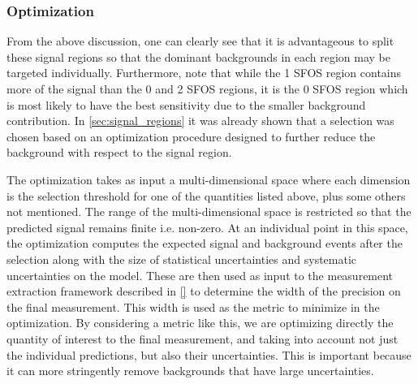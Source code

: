 \subsubsection{Optimization}
\label{sec:optimization}
From the above discussion, one can clearly see that it is
advantageous to split these signal regions so that the dominant
backgrounds in each region may be targeted individually.  Furthermore,
note that while the 1 SFOS region contains more of the signal than the
0 and 2 SFOS regions, it is the 0 SFOS region which is most likely to
have the best sensitivity due to the smaller background contribution.
In \sec\ref{sec:signal_regions} it was already shown
that a selection was chosen based on an optimization procedure
designed to further reduce the background with respect to the 
signal region. 

The optimization takes as input a multi-dimensional 
space where each dimension is the selection threshold
for one of the quantities listed above, plus some others not mentioned.
The range of the multi-dimensional space 
is restricted so that the 
predicted signal remains finite i.e. non-zero.
At an individual point in this space, the optimization computes
the expected signal and background events after the selection
along with the size of statistical uncertainties
and systematic uncertainties on the model. 
These are then used as input to the measurement extraction framework
described in \sec\ref{} to determine the width of the precision
on the final measurement. 
This width is used as the metric to minimize in the optimization.
By considering a metric like this, we are optimizing directly
the quantity of interest to the final measurement, and taking
into account not just the individual predictions, but also their
uncertainties. This is important because it can more stringently
remove backgrounds that have large uncertainties.

